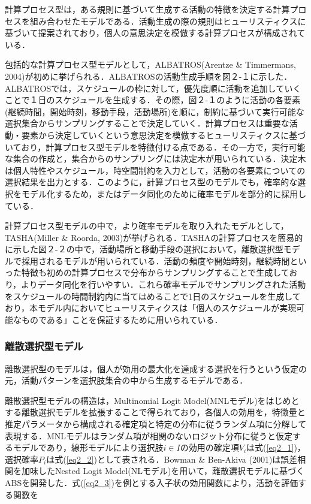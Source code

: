 計算プロセス型は，ある規則に基づいて生成する活動の特徴を決定する計算プロセスを組み合わせたモデルである．活動生成の際の規則はヒューリスティクスに基づいて提案されており，個人の意思決定を模倣する計算プロセスが構成されている．

包括的な計算プロセス型モデルとして，ALBATROS(Arentze \& Timmermans, 2004)が初めに挙げられる．ALBATROSの活動生成手順を図２-１に示した．ALBATROSでは，スケジュールの枠に対して，優先度順に活動を追加していくことで１日のスケジュールを生成する．その際，図２-１のように活動の各要素(継続時間，開始時刻，移動手段，活動場所)を順に，制約に基づいて実行可能な選択集合からサンプリングすることで決定していく．計算プロセスは重要な活動・要素から決定していくという意思決定を模倣するヒューリスティクスに基づいており，計算プロセス型モデルを特徴付ける点である．その一方で，実行可能な集合の作成と，集合からのサンプリングには決定木が用いられている．決定木は個人特性やスケジュール，時空間制約を入力として，活動の各要素についての選択結果を出力とする．このように，計算プロセス型のモデルでも，確率的な選択をモデル化するため，またはデータ同化のために確率モデルを部分的に採用している．

計算プロセス型モデルの中で，より確率モデルを取り入れたモデルとして，TASHA(Miller \& Roorda, 2003)が挙げられる．TASHAの計算プロセスを簡易的に示した図２-２の中で，活動場所と移動手段の選択において，離散選択型モデルで採用されるモデルが用いられている．活動の頻度や開始時刻，継続時間といった特徴も初めの計算プロセスで分布からサンプリングすることで生成しており，よりデータ同化を行いやすい．これら確率モデルでサンプリングされた活動をスケジュールの時間制約内に当てはめることで1日のスケジュールを生成しており，本モデル内においてヒューリスティクスは「個人のスケジュールが実現可能なものである」ことを保証するために用いられている．

\subsubsection{離散選択型モデル}

離散選択型のモデルは，個人が効用の最大化を達成する選択を行うという仮定の元，活動パターンを選択肢集合の中から生成するモデルである．

離散選択型モデルの構造は，Multinomial Logit Model(MNLモデル)をはじめとする離散選択モデルを拡張することで得られており，各個人の効用を，特徴量と推定パラメータから構成される確定項と特定の分布に従うランダム項に分解して表現する．MNLモデルはランダム項が相関のないロジット分布に従うと仮定するモデルであり，線形モデルにより選択肢$i \in I$の効用の確定項$V_{i}$は式(\ref{eq2_1})，選択確率$P_{i}$は式(\ref{eq2_2})として表される．Bowman \& Ben-Akiva (2001)は誤差相関を加味したNested Logit Model(NLモデル)を用いて，離散選択モデルに基づくABSを開発した．式(\ref{eq2_3})を例とする入子状の効用関数により，活動を評価する関数を

